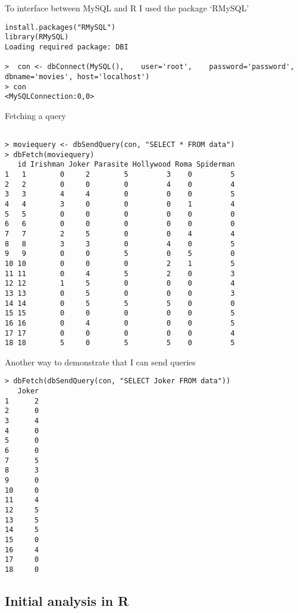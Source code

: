 \documentclass[
]{article}
\begin{document}
To interface between MySQL and R I used the package `RMySQL'

\begin{verbatim}
install.packages("RMySQL")
library(RMySQL)
Loading required package: DBI

>  con <- dbConnect(MySQL(),    user='root',    password='password',   dbname='movies', host='localhost')
> con
<MySQLConnection:0,0>
\end{verbatim}

Fetching a query

\begin{verbatim}

> moviequery <- dbSendQuery(con, "SELECT * FROM data")
> dbFetch(moviequery)
   id Irishman Joker Parasite Hollywood Roma Spiderman
1   1        0     2        5         3    0         5
2   2        0     0        0         4    0         4
3   3        4     4        0         0    0         5
4   4        3     0        0         0    1         4
5   5        0     0        0         0    0         0
6   6        0     0        0         0    0         0
7   7        2     5        0         0    4         4
8   8        3     3        0         4    0         5
9   9        0     0        5         0    5         0
10 10        0     0        0         2    1         5
11 11        0     4        5         2    0         3
12 12        1     5        0         0    0         4
13 13        0     5        0         0    0         3
14 14        0     5        5         5    0         0
15 15        0     0        0         0    0         5
16 16        0     4        0         0    0         5
17 17        0     0        0         0    0         4
18 18        5     0        5         5    0         5
\end{verbatim}

Another way to demonstrate that I can send queries

\begin{verbatim}
> dbFetch(dbSendQuery(con, "SELECT Joker FROM data"))
   Joker
1      2
2      0
3      4
4      0
5      0
6      0
7      5
8      3
9      0
10     0
11     4
12     5
13     5
14     5
15     0
16     4
17     0
18     0
\end{verbatim}

\hypertarget{initial-analysis-in-r}{%
\subsection{Initial analysis in R}\label{initial-analysis-in-r}}
\end{document}
